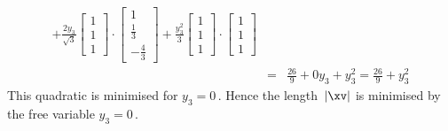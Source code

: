 \begin{example}
\begin{solution}
\begin{eqnarray*}
+\frac{2y_3}{\sqrt3}\begin{bmatrix} 1\\1\\1 \end{bmatrix}\cdot\begin{bmatrix} 1\\\frac13\\-\frac43 \end{bmatrix}
+\frac{y_3^2}{3}\begin{bmatrix} 1\\1\\1 \end{bmatrix}
\cdot\begin{bmatrix} 1\\1\\1 \end{bmatrix}
\\&=&\tfrac{26}9+0y_3+y_3^2
=\tfrac{26}9+y_3^2
\end{eqnarray*}
This quadratic is minimised for \(y_3=0\)\,.
Hence the length~\(|\xv|\) is minimised by the free variable \(y_3=0\)\,.
\end{solution}
\end{example}


